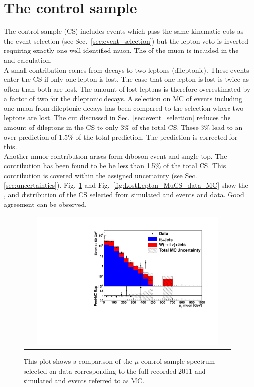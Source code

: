 \section{The control sample}
\label{sec:controlSample}
The control sample (CS) includes events which pass the same kinematic cuts as the event selection (see Sec.~\ref{sec:event_selection}) but the lepton veto is inverted requiring exactly one well identified muon. The \pt of the muon is included in the \HT and \MHT calculation.\\
A small contribution comes from \ttbar decays to two leptons (dileptonic). These events enter the CS if only one lepton is lost. The case that one lepton is lost is twice as often than both are lost. The amount of lost leptons is therefore overestimated by a factor of two for the dileptonic decays. A selection on MC of events including one muon from dileptonic decays has been compared to the selection where two leptons are lost. The \mt cut discussed in Sec.~\ref{sec:event_selection} reduces the amount of dileptons in the CS to only 3\% of the total CS. These 3\% lead to an over-prediction of 1.5\% of the total prediction. The prediction is corrected for this.\\
Another minor contribution arises form diboson event and single top. The contribution has been found to be be less than 1.5\% of the total CS. This contribution is covered within the assigned uncertainty (see Sec.\ref{sec:uncertainties}).
Fig.~\ref{fig:CSmuonpt} and Fig.~\ref{fig:LostLepton_MuCS_data_MC} show the \pt, \HT and \MHT distribution of the CS selected from simulated \ttbar and \wpj events and data. Good agreement can be observed.

\begin{figure}[tbhn]
\label{fig:LostLepton_MuCS_data_MC}
\begin{center}
\begin{tabular}{c}
\includegraphics[width=0.90\textwidth]{lostlepton/plots/closure/CSMuonPT.pdf}
\end{tabular}
\end{center}
\caption{This plot shows a comparison of the $\mu$ control sample \pt spectrum selected on data corresponding to the full \lumi recorded 2011 and simulated \ttbar and \wpj events referred to as MC.}
\label{fig:CSmuonpt}
\end{figure}

